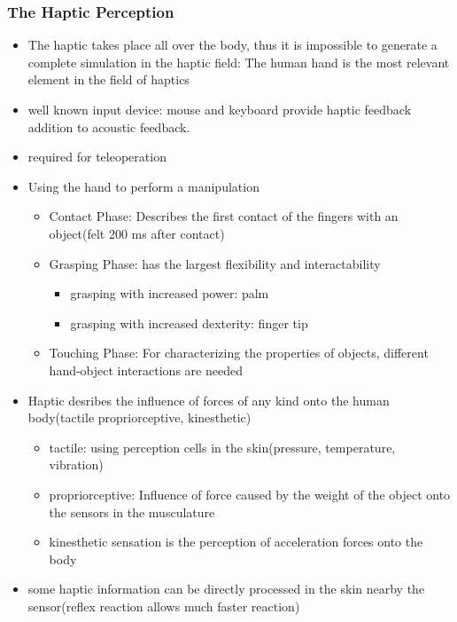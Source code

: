 \documentclass{standalone}
\begin{document}
\subsubsection{The Haptic Perception}
\begin{itemize}
	\item The haptic takes place all over the body, thus it is impossible to generate a complete simulation in the haptic field: The human hand is the most relevant element in the field of haptics
	\item well known input device: mouse and keyboard provide haptic feedback addition to acoustic feedback.
	\item required for teleoperation
	\item Using the hand to perform a manipulation
	\begin{itemize}
		\item Contact Phase: Describes the first contact of the fingers with an object(felt 200 ms after contact)
		\item Grasping Phase: has the largest flexibility and interactability
		\begin{itemize}
			\item grasping with increased power: palm
			\item grasping with increased dexterity: finger tip
		\end{itemize}
		\item Touching Phase: For characterizing the properties of objects, different hand-object interactions are needed
	\end{itemize}
	\item Haptic desribes the influence of forces of any kind onto the human body(tactile propriorceptive, kinesthetic)
	\begin{itemize}
		\item tactile: using perception cells in the skin(pressure, temperature, vibration)
		\item propriorceptive: Influence of force caused by the weight of the object onto the sensors in the musculature
		\item kinesthetic sensation is the perception of acceleration forces onto the body 
	\end{itemize}
	\item some haptic information can be directly processed in the skin nearby the sensor(reflex reaction allows much faster reaction)
\end{itemize}
\end{document}
